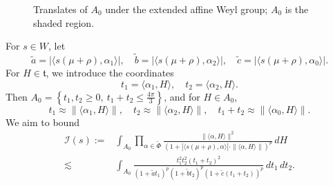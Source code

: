 \documentclass{amsart}
\numberwithin{equation}{section}
\numberwithin{equation}{section}
\begin{document}
\begin{figure}[h]
\centering
{}



\caption{Translates of $A_0$ under the extended affine Weyl group; $A_0$ is the shaded region.}
\label{fig: alcoves}
\end{figure}

For $s \in W$, let
\[
\widetilde{a} = |\langle s(\mu+\rho), \alpha_1 \rangle|,\quad
\widetilde{b} = |\langle s(\mu+\rho), \alpha_2 \rangle|,\quad
\widetilde{c} = |\langle s(\mu+\rho), \alpha_0 \rangle|.
\]
For $H\in\mathfrak{t}$, we introduce the coordinates
$$t_1=\langle\alpha_1,H\rangle, \quad t_2=\langle\alpha_2,H\rangle.$$
Then $A_0=\left\{t_1,t_2\geq 0, \ t_1+t_2\leq \frac{4\pi}{3}\right\}$, and for $H\in A_0$, 
$$t_1\approx \|\langle\alpha_1,H\rangle\|,\quad t_2\approx \|\langle\alpha_2,H\rangle\|,\quad t_1+t_2\approx \|\langle\alpha_0,H\rangle\|.$$
We aim to bound 
\begin{align}
\mathcal{I}(s):=&\int_{A_0} \prod_{\alpha\in\widetilde{\Phi}}
   \frac{\|\langle\alpha,H\rangle\|^2}{(1+|\langle s(\mu+\rho),\alpha\rangle|\cdot\|\langle\alpha, H\rangle\|)^{p}}
   \,dH \label{eq: ABC integral} \\
   \lesssim& \int_{A_0}\frac{t_1^2t_2^2(t_1+t_2)^2}{(1+\widetilde{a}t_1)^p(1+\widetilde{b}t_2)^p(1+\widetilde{c}(t_1+t_2))^p}\,dt_1\,dt_2. \label{eq: ABC integral 2}
\end{align}
\end{document}
